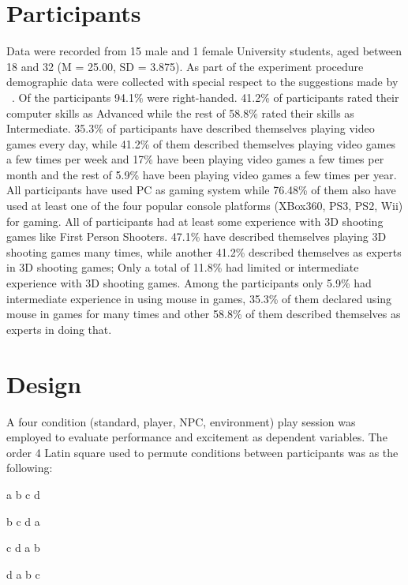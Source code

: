 \documentclass{uofsthesis-cs}
\begin{document}
\section{Participants}
Data were recorded from 15 male and 1 female University students, aged between 18 and 32 (M = 25.00, SD = 3.875). As part of the experiment procedure demographic data were collected with special respect to the suggestions made by ~\cite{?}. Of the participants 94.1\% were right-handed. 41.2\% of participants rated their computer skills as Advanced while the rest of 58.8\% rated their skills as Intermediate. 35.3\% of participants have described themselves playing video games every day, while 41.2\% of them described themselves playing video games a few times per week and 17\% have been playing video games a few times per month and the rest of 5.9\% have been playing video games a few times per year. All participants have used PC as gaming system while 76.48\% of them also have used at least one of the four popular console platforms (XBox360, PS3, PS2, Wii) for gaming. All of participants had at least some experience with 3D shooting games like First Person Shooters. 47.1\% have described themselves playing 3D shooting games many times, while another 41.2\% described themselves as experts in 3D shooting games; Only a total of 11.8\% had limited or intermediate experience with 3D shooting games. Among the participants only 5.9\% had intermediate experience in using mouse in games, 35.3\% of them declared using mouse in games for many times and other 58.8\% of them described themselves as experts in doing that.

\section{Design}

A four condition (standard, player, NPC, environment) play session was employed to evaluate performance and excitement as dependent variables. The order 4 Latin square used to permute conditions between participants was as the following:

\centerline{a b c d}
\centerline{b c d a}
\centerline{c d a b}
\centerline{d a b c}
\end{document}
